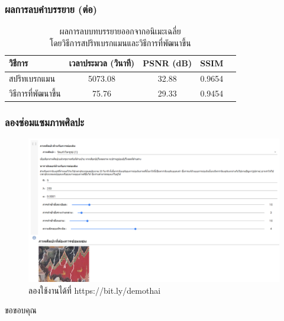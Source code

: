 \documentclass[xcolor=dvipsnames, xetex,serif]{beamer}
\numberwithin{equation}{section}
\begin{document}
    \begin{frame}
        \frametitle{ผลการลบคำบรรยาย (ต่อ)}
        \begin{table}[H]
            \centering
            \captionsetup{justification=centering}
            \begin{tabular}[ht]{|l|c|c|c|c|}
                \hline
                วิธีการ  & เวลาประมวล  (วินาที) & PSNR (dB) & SSIM \\
                \hline
                สปริทเบรกแมน & 5073.08 & 32.88 & 0.9654 \\
                วิธีการที่พัฒนาขึ้น & 75.76 & 29.33 & 0.9454 \\
                \hline
            \end{tabular}
            \caption{ผลการลบบทบรรยายออกจากอนิเมะเฉลี่ย\\โดยวิธีการสปริทเบรกแมนและวิธีการที่พัฒนาขึ้น}
        \end{table}	
    \end{frame}
    \begin{frame}
        \frametitle{ลองซ่อมแซมภาพศิลปะ}
        \centering
        \begin{figure}[H]
            \centering
            \includegraphics[width=0.8\linewidth]{images/colab_sample.png}
            \caption{ลองใช้งานได้ที่ https://bit.ly/demothai}
        \end{figure}
    \end{frame}
    \begin{frame}
        \centering
        \Huge{ขอขอบคุณ}
    \end{frame}
\end{document}
